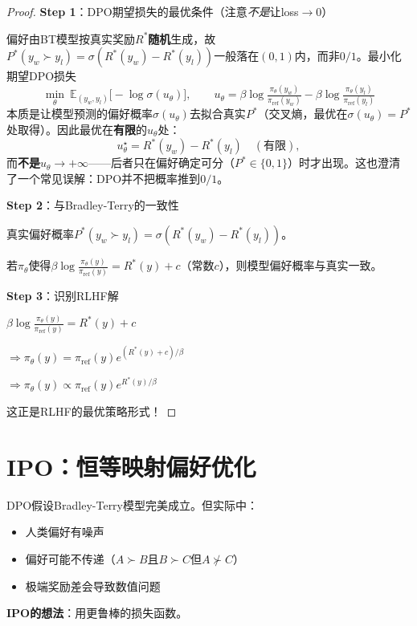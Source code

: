 \documentclass[11pt,a4paper]{article}
\theoremstyle{definition}
\begin{document}
\begin{proof}
\textbf{Step 1}：DPO期望损失的最优条件（注意\emph{不是}让loss$\to0$）

偏好由BT模型按真实奖励$R^*$\textbf{随机}生成，故$P^*(y_w\succ y_l)=\sigma(R^*(y_w)-R^*(y_l))$一般落在$(0,1)$内，而非$0/1$。最小化期望DPO损失
\[
\min_\theta\ \mathbb{E}_{(y_w,y_l)}\big[-\log\sigma(u_\theta)\big],\qquad u_\theta=\beta\log\tfrac{\pi_\theta(y_w)}{\pi_{\text{ref}}(y_w)}-\beta\log\tfrac{\pi_\theta(y_l)}{\pi_{\text{ref}}(y_l)}
\]
本质是让模型预测的偏好概率$\sigma(u_\theta)$去拟合真实$P^*$（交叉熵，最优在$\sigma(u_\theta)=P^*$处取得）。因此最优在\textbf{有限}的$u_\theta$处：
\[
u_\theta^\star = R^*(y_w)-R^*(y_l)\quad(\text{有限}),
\]
而\textbf{不是}$u_\theta\to+\infty$——后者只在偏好确定可分（$P^*\in\{0,1\}$）时才出现。这也澄清了一个常见误解：DPO并不把概率推到$0/1$。

\textbf{Step 2}：与Bradley-Terry的一致性

真实偏好概率$P^*(y_w \succ y_l) = \sigma(R^*(y_w) - R^*(y_l))$。

若$\pi_\theta$使得$\beta \log \frac{\pi_\theta(y)}{\pi_{\text{ref}}(y)} = R^*(y) + c$（常数$c$），则模型偏好概率与真实一致。

\textbf{Step 3}：识别RLHF解

$\beta \log \frac{\pi_\theta(y)}{\pi_{\text{ref}}(y)} = R^*(y) + c$

$\Rightarrow \pi_\theta(y) = \pi_{\text{ref}}(y) e^{(R^*(y) + c)/\beta}$

$\Rightarrow \pi_\theta(y) \propto \pi_{\text{ref}}(y) e^{R^*(y)/\beta}$

这正是RLHF的最优策略形式！
\end{proof}

\section{IPO：恒等映射偏好优化}

\begin{plainwords}[DPO的问题]
DPO假设Bradley-Terry模型完美成立。但实际中：
\begin{itemize}
    \item 人类偏好有噪声
    \item 偏好可能不传递（$A \succ B$且$B \succ C$但$A \not\succ C$）
    \item 极端奖励差会导致数值问题
\end{itemize}

\textbf{IPO的想法}：用更鲁棒的损失函数。
\end{plainwords}
\end{document}
